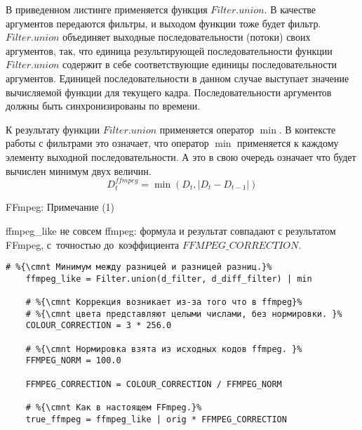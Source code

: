 \begin{noteframe}
    В приведенном листинге применяется функция $Filter.union$.
    В качестве аргументов передаются фильтры, 
    и выходом функции тоже будет фильтр. 
    $Filter.union$ объединяет выходные последовательности (потоки)
    своих аргументов, так, что единица результирующей  последовательности функции $Filter.union$ содержит 
    в себе соответствующие единицы последовательности аргументов.
    Единицей последовательности в данном случае выступает 
    значение вычисляемой функции для текущего кадра.
    Последовательности аргументов должны быть 
    синхронизированы по времени.
    
    К результату функции $Filter.union$ применяется оператор $\min$.
    В контексте работы с фильтрами это означает, что оператор $\min$
    применяется к каждому элементу выходной последовательности.
    А это в свою очередь означает что будет 
    вычислен минимум двух величин.
    \[
        D_{t}^{ffmpeg} = \min(D_t, \left|D_t - D_{t-1} \right|)
    \]
\end{noteframe}


\begin{frame}[fragile]{FFmpeg: Примечание (1)}
    
    \begin{mgraybox}{ffmpeg\_like не совсем ffmpeg:}
        формула и результат совпадают с результатом FFmpeg, 
        с~точностью до~коэффициента $FFMPEG\_CORRECTION$.
    \end{mgraybox}

    \begin{lstlisting}[language=FilterPython]
    # %{\cmnt Минимум между разницей и разницей разниц.}%
    ffmpeg_like = Filter.union(d_filter, d_diff_filter) | min
    
    # %{\cmnt Коррекция возникает из-за того что в ffmpeg}% 
    # %{\cmnt цвета представляют целыми числами, без нормировки. }%
    COLOUR_CORRECTION = 3 * 256.0
    
    # %{\cmnt Нормировка взята из исходных кодов ffmpeg. }% 
    FFMPEG_NORM = 100.0
    
    FFMPEG_CORRECTION = COLOUR_CORRECTION / FFMPEG_NORM
    
    # %{\cmnt Как в настоящем FFmpeg.}%
    true_ffmpeg = ffmpeg_like | orig * FFMPEG_CORRECTION
    \end{lstlisting}
\end{frame}

